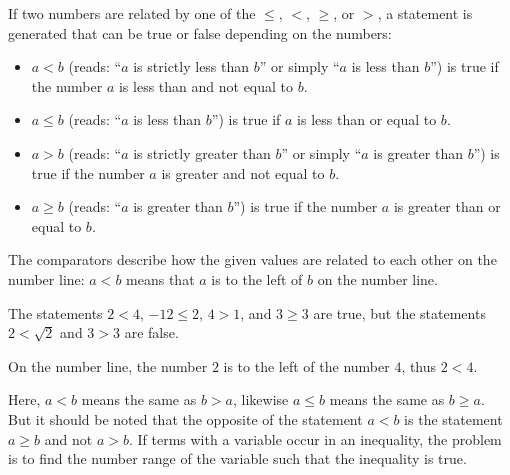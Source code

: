 \begin{MIntro}

\begin{MInfo}
If two numbers are related by one of the  
$\leq$, $<$, $\geq$, or $>$, a statement is generated that can be true or false depending on 
the numbers:
\begin{itemize}
\item{$a<b$ (reads: ``$a$ is strictly less than $b$'' or simply ``$a$ is less than $b$'') is true if the number $a$ is less than and not equal to $b$.}
\item{$a \leq b$ (reads: ``$a$ is less than $b$'') is true if $a$ is less than or equal to $b$.}
\item{$a>b$ (reads: ``$a$ is strictly greater than $b$'' or simply ``$a$ is greater than $b$'') is true if the number $a$ is greater and not equal to $b$.}
\item{$a \geq b$ (reads: ``$a$ is greater than $b$'') is true if the number $a$ is greater than or equal to $b$.}
\end{itemize}
\end{MInfo}

The comparators describe how the given values are related to each other on the number line: 
$a<b$ means that $a$ is to the left of $b$ on the number line.

\begin{MExample}
The statements $2<4$, $-12\leq 2$, $4>1$, and $3\geq 3$ are true,
but the statements $2<\sqrt2$ and $3>3$ are false.

\begin{center}
%

On the number line, the number $2$ is to the left of the number $4$, thus $2<4$.
\end{center}

\end{MExample}

Here, $a<b$ means the same as $b>a$, likewise $a\leq b$ means the same as $b\geq a$. But it
should be noted that the opposite of the statement $a<b$ is the statement $a\geq b$ and not
$a>b$. If terms with a variable occur in an inequality, the problem is to find the number range
of the variable such that the inequality is true. 
\end{MIntro}

